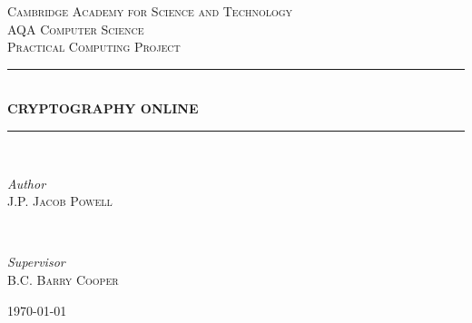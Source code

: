 %
%

\begin{titlepage}

\newcommand{\HRule}{\rule{\linewidth}{0.5mm}}

\center


\textsc{\LARGE Cambridge Academy for Science and Technology}\\[1.5cm]
\textsc{\Large AQA Computer Science}\\[0.5cm]
\textsc{\large Practical Computing Project}\\[0.5cm]


\HRule\\[0.4cm]

{\huge\bfseries \textsc{CRYPTOGRAPHY ONLINE}}\\[0.4cm]

\HRule\\[1.5cm]

\begin{minipage}{0.4\textwidth}
	\begin{flushleft}
		\large
		\textit{Author}\\
		J.P. \textsc{Jacob Powell}
	\end{flushleft}
\end{minipage}
~
\begin{minipage}{0.4\textwidth}
	\begin{flushright}
	\large
	\textit{Supervisor}\\
	B.C. \textsc{Barry Cooper}
	\end{flushright}
\end{minipage}

%
%

\vfill\vfill\vfill %
{\large\today}

%
%

\vfill

\end{titlepage}

